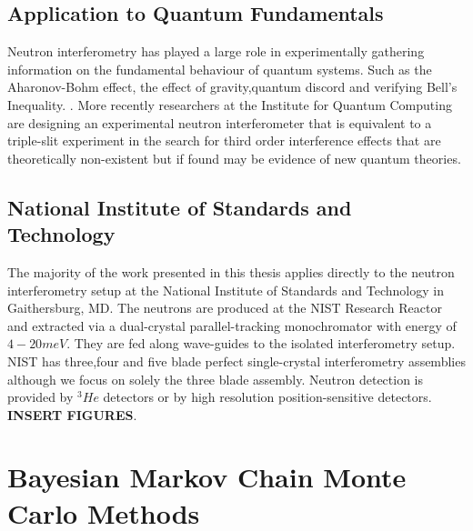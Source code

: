 \subsection{Application to Quantum Fundamentals}
Neutron interferometry has played a large role in experimentally gathering information on the fundamental behaviour of quantum systems. Such as the Aharonov-Bohm effect, the effect of gravity,quantum discord and verifying Bell's Inequality. \cite{neutron_history}\cite{cow}\cite{noise_neutron}\cite{bells_inequality}. More recently researchers at the Institute for Quantum Computing are designing an experimental neutron interferometer that is equivalent to a triple-slit experiment in the search for third order interference effects that are theoretically non-existent but if found may be evidence of new quantum theories.\cite{three_slit} 
\subsection{National Institute of Standards and Technology}
The majority of the work presented in this thesis applies directly to the neutron interferometry setup at the National Institute of Standards and Technology in Gaithersburg, MD. The neutrons are produced at the NIST Research Reactor and extracted via a dual-crystal parallel-tracking monochromator with energy of $4-20 meV$. They are fed along wave-guides to the isolated interferometry setup. NIST has three,four and five blade perfect single-crystal interferometry assemblies although we focus on solely the three blade assembly. Neutron detection is provided by $^3He$ detectors or by high resolution position-sensitive detectors.\cite{nist_setup}\cite{nist_powerpoint} 
\textbf{INSERT FIGURES}. 
\section{Bayesian Markov Chain Monte Carlo Methods}

